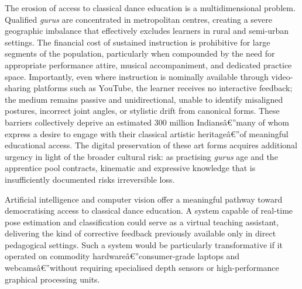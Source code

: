 \documentclass[journal]{IEEEtran}
\begin{document}
The erosion of access to classical dance education is a multidimensional
problem. Qualified \textit{gurus} are concentrated in metropolitan
centres, creating a severe geographic imbalance that effectively
excludes learners in rural and semi-urban settings. The financial cost
of sustained instruction is prohibitive for large segments of the
population, particularly when compounded by the need for appropriate
performance attire, musical accompaniment, and dedicated practice
space. Importantly, even where instruction is nominally available
through video-sharing platforms such as YouTube, the learner receives
no interactive feedback; the medium remains passive and unidirectional,
unable to identify misaligned postures, incorrect joint angles, or
stylistic drift from canonical forms. These barriers collectively
deprive an estimated 300 million Indiansâ€”many of whom express a desire
to engage with their classical artistic heritageâ€”of meaningful
educational access. The digital preservation of these art forms
acquires additional urgency in light of the broader cultural risk:
as practising \textit{gurus} age and the apprentice pool contracts,
kinematic and expressive knowledge that is insufficiently documented
risks irreversible loss.

Artificial intelligence and computer vision offer a meaningful pathway
toward democratising access to classical dance education. A system
capable of real-time pose estimation and classification could serve as
a virtual teaching assistant, delivering the kind of corrective feedback
previously available only in direct pedagogical settings. Such a system
would be particularly transformative if it operated on commodity
hardwareâ€”consumer-grade laptops and webcamsâ€”without requiring
specialised depth sensors or high-performance graphical processing
units.
\end{document}
